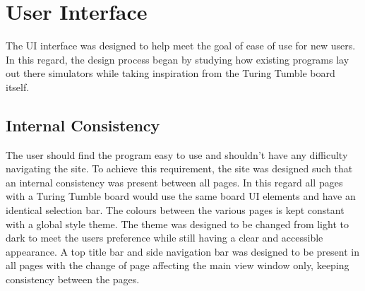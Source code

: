 \documentclass{l4proj}
\begin{document}


\section{User Interface}

The UI interface was designed to help meet the goal of ease of use for new users. In this regard, the design process began by studying how existing programs lay out there simulators while taking inspiration from the Turing Tumble board itself.

\subsection{Internal Consistency}
The user should find the program easy to use and shouldn't have any difficulty navigating the site. To achieve this requirement, the site was designed such that an internal consistency was present between all pages. In this regard all pages with a Turing Tumble board would use the same board UI elements and have an identical selection bar. The colours between the various pages is kept constant with a global style theme. The theme was designed to be changed from light to dark to meet the users preference while still having a clear and accessible appearance. A top title bar and side navigation bar was designed to be present in all pages with the change of page affecting the main view window only, keeping consistency between the pages.
\end{document}
